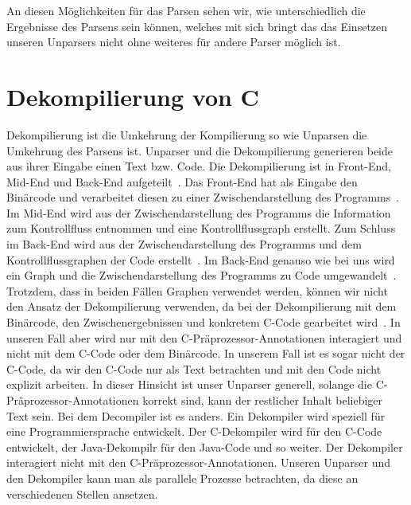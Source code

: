 An diesen Möglichkeiten für das Parsen sehen wir, wie unterschiedlich die Ergebnisse des Parsens sein können, welches mit sich bringt das das Einsetzen unseren Unparsers nicht ohne weiteres für andere Parser möglich ist.

 
\section{Dekompilierung von C}
Dekompilierung ist die Umkehrung der Kompilierung so wie Unparsen die Umkehrung des Parsens ist. Unparser und die Dekompilierung generieren beide aus ihrer Eingabe einen Text bzw. Code. Die Dekompilierung ist in Front-End, Mid-End und Back-End aufgeteilt~\cite{10.1145/3650212.3652144,Cifuentes1993AMF,10.1145/3395363.3397370}. Das Front-End hat als Eingabe den Binärcode und verarbeitet diesen zu einer Zwischendarstellung des Programms~\cite{Cifuentes1993AMF,10.1145/3395363.3397370}. Im Mid-End wird aus der Zwischendarstellung des Programms die Information zum Kontrollfluss entnommen und eine Kontrollflussgraph erstellt. Zum Schluss im Back-End wird aus der Zwischendarstellung des Programms und dem Kontrollflussgraphen der  Code erstellt~\cite{Cifuentes1993AMF,10.1145/3395363.3397370}. Im Back-End genauso wie bei uns wird ein Graph und die Zwischendarstellung des Programms zu Code umgewandelt~\cite{Cifuentes1993AMF,10.1145/3395363.3397370}. Trotzdem, dass in beiden Fällen Graphen verwendet werden, können wir nicht den Ansatz der Dekompilierung verwenden, da bei der Dekompilierung mit dem Binärcode, den Zwischenergebnissen und konkretem C-Code gearbeitet wird~\cite{10.1145/3650212.3652144,Cifuentes1993AMF,10.1145/3395363.3397370}. In unseren Fall aber wird nur mit den C-Präprozessor-Annotationen interagiert und nicht mit dem C-Code oder dem Binärcode. In unserem Fall ist es sogar nicht der C-Code, da wir den C-Code nur als Text betrachten und mit den Code nicht explizit arbeiten. In dieser Hinsicht ist unser Unparser generell, solange die C-Präprozessor-Annotationen korrekt sind, kann der restlicher Inhalt beliebiger Text sein. Bei dem Decompiler ist es anders. Ein Dekompiler wird speziell für eine Programmiersprache entwickelt. Der C-Dekompiler wird für den C-Code entwickelt, der Java-Dekompilr für den Java-Code und so weiter. Der Dekompiler interagiert nicht mit den C-Präprozessor-Annotationen. Unseren Unparser und den Dekompiler kann man als parallele Prozesse betrachten, da diese an verschiedenen Stellen ansetzen.

